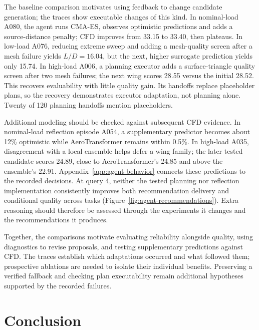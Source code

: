 \documentclass{article} %
\begin{document}
The baseline comparison motivates using feedback to change candidate
generation; the traces show executable changes of this kind. In nominal-load
A080, the agent runs CMA-ES, observes optimistic predictions and adds a
source-distance penalty; CFD improves from 33.15 to 33.40, then plateaus.
In low-load A076, reducing extreme sweep and adding a mesh-quality screen
after a mesh failure yields $L/D=16.04$, but the next, higher surrogate
prediction yields only 15.74. In high-load A006, a planning executor adds a
surface-triangle quality screen after two mesh failures; the next wing
scores 28.55 versus the initial 28.52. This recovers evaluability with little
quality gain. Its handoffs replace placeholder plans, so the recovery
demonstrates executor adaptation, not planning alone. Twenty of 120 planning
handoffs mention placeholders.

Additional modeling should be checked against subsequent CFD evidence.
In nominal-load reflection episode A054, a supplementary predictor becomes
about 12\% optimistic while AeroTransformer remains within 0.5\%.
In high-load A035, disagreement with a local ensemble helps defer a wing
family; the later tested candidate scores 24.89, close to AeroTransformer's
24.85 and above the ensemble's 22.91. Appendix~\ref{app:agent-behavior}
connects these predictions to the recorded decisions. At query 4, neither
the tested planning nor reflection implementation consistently improves both
recommendation delivery and conditional quality across tasks
(Figure~\ref{fig:agent-recommendations}). Extra reasoning should therefore
be assessed through the experiments it changes and the recommendations it
produces.

Together, the comparisons motivate evaluating reliability alongside quality,
using diagnostics to revise proposals, and testing supplementary predictions
against CFD. The traces establish which adaptations occurred and what
followed them; prospective ablations are needed to isolate their individual
benefits. Preserving a verified fallback and checking plan executability
remain additional hypotheses supported by the recorded failures.

\section{Conclusion}
\label{sec:conclusion}
\end{document}
